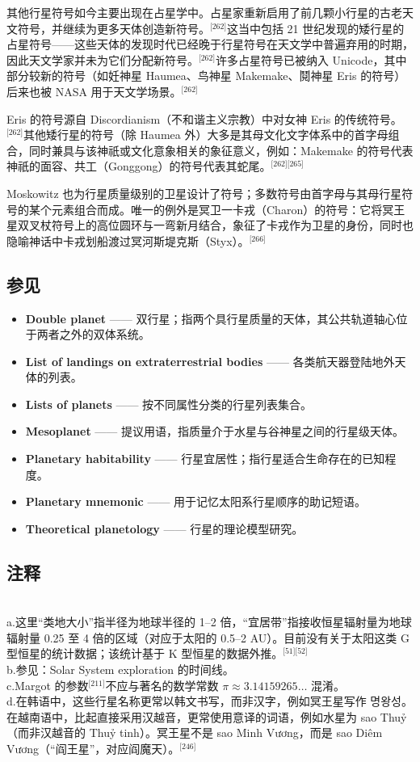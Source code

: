 其他行星符号如今主要出现在占星学中。占星家重新启用了前几颗小行星的古老天文符号，并继续为更多天体创造新符号。\(^\text{[262]}\)这当中包括 21 世纪发现的矮行星的占星符号——这些天体的发现时代已经晚于行星符号在天文学中普遍弃用的时期，因此天文学家并未为它们分配新符号。\(^\text{[262]}\)许多占星符号已被纳入 Unicode，其中部分较新的符号（如妊神星 Haumea、鸟神星 Makemake、鬩神星 Eris 的符号）后来也被 NASA 用于天文学场景。\(^\text{[262]}\)

Eris 的符号源自 Discordianism（不和谐主义宗教）中对女神 Eris 的传统符号。\(^\text{[262]}\)其他矮行星的符号（除 Haumea 外）大多是其母文化文字体系中的首字母组合，同时兼具与该神祇或文化意象相关的象征意义，例如：Makemake 的符号代表神祇的面容、共工（Gonggong）的符号代表其蛇尾。\(^\text{[262][265]}\)

Moskowitz 也为行星质量级别的卫星设计了符号；多数符号由首字母与其母行星符号的某个元素组合而成。唯一的例外是冥卫一卡戎（Charon）的符号：它将冥王星双叉杖符号上的高位圆环与一弯新月结合，象征了卡戎作为卫星的身份，同时也隐喻神话中卡戎划船渡过冥河斯堤克斯（Styx）。\(^\text{[266]}\)
\subsection{参见}
\begin{itemize}
\item \textbf{Double planet} —— 双行星；指两个具行星质量的天体，其公共轨道轴心位于两者之外的双体系统。
\item \textbf{List of landings on extraterrestrial bodies} —— 各类航天器登陆地外天体的列表。
\item \textbf{Lists of planets} —— 按不同属性分类的行星列表集合。
\item \textbf{Mesoplanet} —— 提议用语，指质量介于水星与谷神星之间的行星级天体。
\item \textbf{Planetary habitability} —— 行星宜居性；指行星适合生命存在的已知程度。
\item \textbf{Planetary mnemonic} —— 用于记忆太阳系行星顺序的助记短语。
\item \textbf{Theoretical planetology} —— 行星的理论模型研究。
\end{itemize}
\subsection{注释}\\
a.这里“类地大小”指半径为地球半径的 1–2 倍，“宜居带”指接收恒星辐射量为地球辐射量 0.25 至 4 倍的区域（对应于太阳的 0.5–2 AU）。目前没有关于太阳这类 G 型恒星的统计数据；该统计基于 K 型恒星的数据外推。\(^\text{[51][52]}\)\\
b.参见：Solar System exploration 的时间线。\\
c.Margot 的参数\(^\text{[211]}\)不应与著名的数学常数 $\pi\approx 3.14159265\ldots$ 混淆。\\
d.在韩语中，这些行星名称更常以韩文书写，而非汉字，例如冥王星写作 명왕성。在越南语中，比起直接采用汉越音，更常使用意译的词语，例如水星为 sao Thuỷ（而非汉越音的 Thuỷ tinh）。冥王星不是 sao Minh Vương，而是 sao Diêm Vương（“阎王星”，对应阎魔天）。\(^\text{[246]}\)
